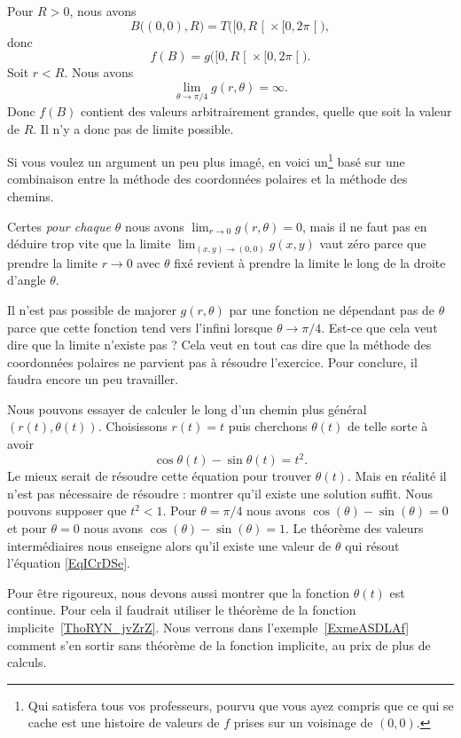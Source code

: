 \begin{example}
	Pour \( R>0\), nous avons
	\begin{equation}
		B\big( (0,0),R \big)=T\big( \mathopen[ 0 , R \mathclose[\times \mathopen[ 0 , 2\pi \mathclose[ \big),
	\end{equation}
	donc
	\begin{equation}
		f(B)=g\big( \mathopen[ 0 , R \mathclose[\times \mathopen[ 0 , 2\pi \mathclose[ \big).
	\end{equation}
	Soit \( r<R\). Nous avons
	\begin{equation}
		\lim_{\theta\to \pi/4} g(r,\theta)=\infty.
	\end{equation}
	Donc \( f(B)\) contient des valeurs arbitrairement grandes, quelle que soit la valeur de \( R\). Il n'y a donc pas de limite possible.

	Si vous voulez un argument un peu plus imagé, en voici un\footnote{Qui satisfera tous vos professeurs, pourvu que vous ayez compris que ce qui se cache est une histoire de valeurs de \( f\) prises sur un voisinage de \( (0,0)\).} basé sur une combinaison entre la méthode des coordonnées polaires et la méthode des chemins.

	Certes \emph{pour chaque \( \theta\)} nous avons \( \lim_{r\to 0} g(r,\theta)=0\), mais il ne faut pas en déduire trop vite que la limite \( \lim_{(x,y)\to(0,0)}g(x,y)\) vaut zéro parce que prendre la limite \( r\to 0\) avec \( \theta\) fixé revient à prendre la limite le long de la droite d'angle \( \theta\).

	Il n'est pas possible de majorer \( g(r,\theta)\) par une fonction ne dépendant pas de \( \theta\) parce que cette fonction tend vers l'infini lorsque \( \theta\to\pi/4\). Est-ce que cela veut dire que la limite n'existe pas ? Cela veut en tout cas dire que la méthode des coordonnées polaires ne parvient pas à résoudre l'exercice. Pour conclure, il faudra encore un peu travailler.

	Nous pouvons essayer de calculer le long d'un chemin plus général \( (r(t),\theta(t))\). Choisissons \( r(t)=t\) puis cherchons \( \theta(t)\) de telle sorte à avoir
	\begin{equation}        \label{EqICrDSe}
		\cos\theta(t)-\sin\theta(t)=t^2.
	\end{equation}
	Le mieux serait de résoudre cette équation pour trouver \( \theta(t)\). Mais en réalité il n'est pas nécessaire de résoudre : montrer qu'il existe une solution suffit. Nous pouvons supposer que \( t^2<1\). Pour \( \theta=\pi/4\) nous avons \( \cos(\theta)-\sin(\theta)=0\) et pour \( \theta=0\) nous avons \( \cos(\theta)-\sin(\theta)=1\). Le théorème des valeurs intermédiaires nous enseigne alors qu'il existe une valeur de \( \theta\) qui résout l'équation \eqref{EqICrDSe}.

	Pour être rigoureux, nous devons aussi montrer que la fonction \( \theta(t)\) est continue. Pour cela il faudrait utiliser le théorème de la fonction implicite~\ref{ThoRYN_jvZrZ}.
	Nous verrons dans l'exemple~\ref{ExmeASDLAf} comment s'en sortir sans théorème de la fonction implicite, au prix de plus de calculs.
\end{example}

